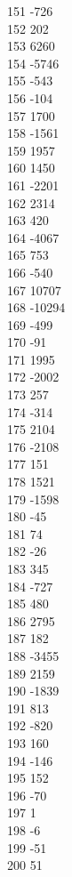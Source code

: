 { 151	-726 \\
 152	202 \\
 153	6260 \\
 154	-5746 \\
 155	-543 \\
 156	-104 \\
 157	1700 \\
 158	-1561 \\
 159	1957 \\
 160	1450 \\
 161	-2201 \\
 162	2314 \\
 163	420 \\
 164	-4067 \\
 165	753 \\
 166	-540 \\
 167	10707 \\
 168	-10294 \\
 169	-499 \\
 170	-91 \\
 171	1995 \\
 172	-2002 \\
 173	257 \\
 174	-314 \\
 175	2104 \\
 176	-2108 \\
 177	151 \\
 178	1521 \\
 179	-1598 \\
 180	-45 \\
 181	74 \\
 182	-26 \\
 183	345 \\
 184	-727 \\
 185	480 \\
 186	2795 \\
 187	182 \\
 188	-3455 \\
 189	2159 \\
 190	-1839 \\
 191	813 \\
 192	-820 \\
 193	160 \\
 194	-146 \\
 195	152 \\
 196	-70 \\
 197	1 \\
 198	-6 \\
 199	-51 \\
 200	51 \\
}
